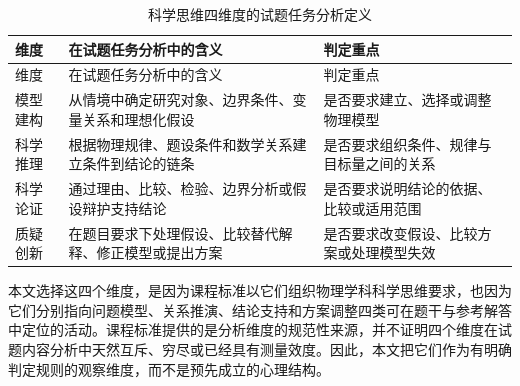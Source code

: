 \documentclass[
  12pt,
  a4paper,twoside,openany]{ctexbook}
\begin{document}
\begin{longtable}[]{@{}
  >{\raggedright\arraybackslash}p{}
  >{\raggedright\arraybackslash}p{}
  >{\raggedright\arraybackslash}p{}@{}}
\caption{科学思维四维度的试题任务分析定义}\tabularnewline
\toprule\noalign{}
\rowcolor{ThesisPale}
\begin{minipage}[b]{\linewidth}\raggedright
维度
\end{minipage} & \begin{minipage}[b]{\linewidth}\raggedright
在试题任务分析中的含义
\end{minipage} & \begin{minipage}[b]{\linewidth}\raggedright
判定重点
\end{minipage} \\
\midrule\noalign{}
\endfirsthead
\toprule\noalign{}
\rowcolor{ThesisPale}
\begin{minipage}[b]{\linewidth}\raggedright
维度
\end{minipage} & \begin{minipage}[b]{\linewidth}\raggedright
在试题任务分析中的含义
\end{minipage} & \begin{minipage}[b]{\linewidth}\raggedright
判定重点
\end{minipage} \\
\midrule\noalign{}
\endhead
\bottomrule\noalign{}
\endlastfoot
模型建构 & 从情境中确定研究对象、边界条件、变量关系和理想化假设 &
是否要求建立、选择或调整物理模型 \\
科学推理 & 根据物理规律、题设条件和数学关系建立条件到结论的链条 &
是否要求组织条件、规律与目标量之间的关系 \\
科学论证 & 通过理由、比较、检验、边界分析或假设辩护支持结论 &
是否要求说明结论的依据、比较或适用范围 \\
质疑创新 & 在题目要求下处理假设、比较替代解释、修正模型或提出方案 &
是否要求改变假设、比较方案或处理模型失效 \\
\end{longtable}

本文选择这四个维度，是因为课程标准以它们组织物理学科科学思维要求，也因为它们分别指向问题模型、关系推演、结论支持和方案调整四类可在题干与参考解答中定位的活动。课程标准提供的是分析维度的规范性来源，并不证明四个维度在试题内容分析中天然互斥、穷尽或已经具有测量效度。因此，本文把它们作为有明确判定规则的观察维度，而不是预先成立的心理结构。
\end{document}
